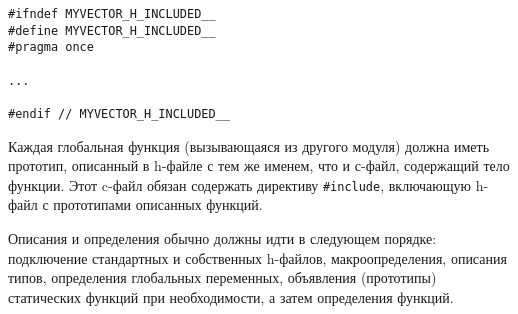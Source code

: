 \begin{verbatim}
#ifndef MYVECTOR_H_INCLUDED__
#define MYVECTOR_H_INCLUDED__
#pragma once

...

#endif // MYVECTOR_H_INCLUDED__
\end{verbatim}

\zzstyleitem

Каждая глобальная функция (вызывающаяся из другого модуля) должна иметь
прототип, описанный в h-файле с тем же именем, что и с-файл, содержащий
тело функции. Этот c-файл обязан содержать директиву \texttt{\#include},
включающую h-файл с прототипами описанных функций.

\zzstyleitem

Описания и определения обычно должны идти в следующем порядке:
подключение стандартных и собственных h-файлов, макроопределения,
описания типов, определения глобальных переменных, объявления
(прототипы) статических функций при необходимости, а затем определения
функций.
